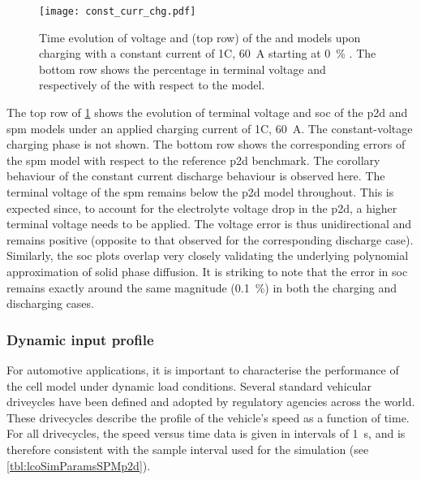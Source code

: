 \begin{figure}[!htbp]
    \centering
    \texttt{[image: const\_curr\_chg.pdf]}
    \caption[Voltage and  computed by  and
     for 1C constant current charge]{Time evolution of voltage
        and  (top row) of the  and
         models upon charging with a constant current of 1C,
        \ie{} \SI{60}{\ampere} starting at \SI{0}{\percent} .
        The bottom row shows the percentage in terminal voltage and
         respectively of the  with respect to
    the  model.}
    \label{fig:cnstchgspmp2d}
\end{figure}

The top row of \cref{fig:cnstchgspmp2d} shows  the evolution of terminal voltage
and \gls{soc}  of the \gls{p2d} and  \gls{spm} models under an  applied charging
current of  1C, \ie{} \SI{60}{\ampere}.  The constant-voltage charging  phase is
not shown. The bottom row shows  the corresponding errors of the \gls{spm} model
with respect  to the reference  \gls{p2d} benchmark. The corollary  behaviour of
the constant current discharge behaviour  is observed here. The terminal voltage
of the \gls{spm} remains below the  \gls{p2d} model throughout. This is expected
since, to  account for the electrolyte  voltage drop in the  \gls{p2d}, a higher
terminal voltage needs  to be applied. The voltage error  is thus unidirectional
and remains positive (opposite to  that observed for the corresponding discharge
case).  Similarly,  the \gls{soc}  plots  overlap  very closely  validating  the
underlying polynomial approximation of solid  phase diffusion. It is striking to
note  that the  error in  \gls{soc} remains  exactly around  the same  magnitude
(\approx\SI{0.1}{\percent}) in both the charging and discharging cases.

\subsubsection*{Dynamic input profile}\label{subsubsec:dynamicspmp2dsim}

For automotive applications, it is  important to characterise the performance of
the  cell  model  under  dynamic load  conditions.  Several  standard  vehicular
driveycles  have been  defined and  adopted  by regulatory  agencies across  the
world. These drivecycles
describe  the  profile  of the  vehicle's  speed  as  a  function of  time.  For
all  drivecycles,  the  speed  versus  time   data  is  given  in  intervals  of
\SI{1}{\second}, and is  therefore consistent with the sample  interval used for
the simulation (see \cref{tbl:lcoSimParamsSPMp2d}).

